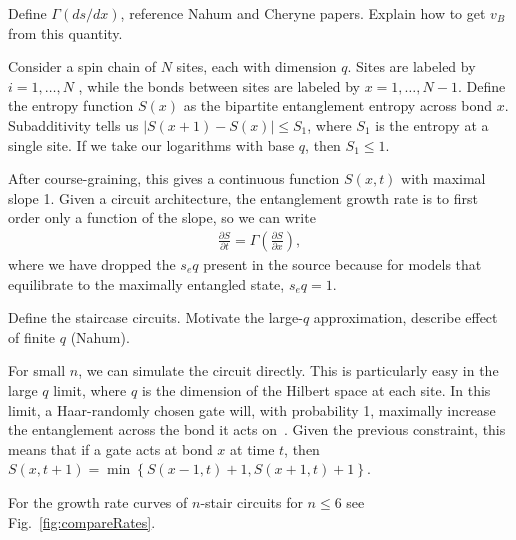 \documentclass[aps,prl,reprint,superscriptaddress, longbibliography]{revtex4-1}
\begin{document}
Define $\Gamma(ds/dx)$, reference Nahum and Cheryne papers. Explain how to get $v_B$ from this quantity.

Consider a spin chain of $N$ sites, each with dimension $q$. Sites are labeled by $i = 1,\dots, N$ , while the bonds between sites are labeled by $x = 1, \dots, N − 1$. Define the entropy function $S(x)$ as the bipartite entanglement entropy across bond $x$. Subadditivity tells us $|S(x + 1) − S(x)| \le S_1$, where $S_1$ is the entropy at a single site. If we take our logarithms with base $q$, then $S_1 \le 1$.

After course-graining, this gives a continuous function $S(x,t)$ with maximal slope 1. Given a circuit architecture, the entanglement growth rate is to first order only a function of the slope, so we can write \cite{jonay}
\begin{align}
\frac{\partial S}{\partial t} = \Gamma\left(\frac{\partial S}{\partial x}\right),
\end{align}
where we have dropped the $s_eq$ present in the source because for models that equilibrate to the maximally entangled state, $s_eq=1$. 

Define the staircase circuits. Motivate the large-$q$ approximation, describe effect of finite $q$ (Nahum).

For small $n$, we can simulate the circuit directly. This is particularly easy in the large $q$ limit, where $q$ is the dimension of the Hilbert space at each site. In this limit, a Haar-randomly chosen gate will, with probability 1, maximally increase the entanglement across the bond it acts on~\cite{nahum2017quantum}. Given the previous constraint, this means that if a gate acts at bond $x$ at time $t$, then $S(x, t+1) = \min\left\lbrace S(x-1,t)+1, S(x+1,t)+1\right\rbrace$.

For the growth rate curves of $n$-stair circuits for $n\le 6$ see Fig.~\ref{fig:compareRates}.
\end{document}
